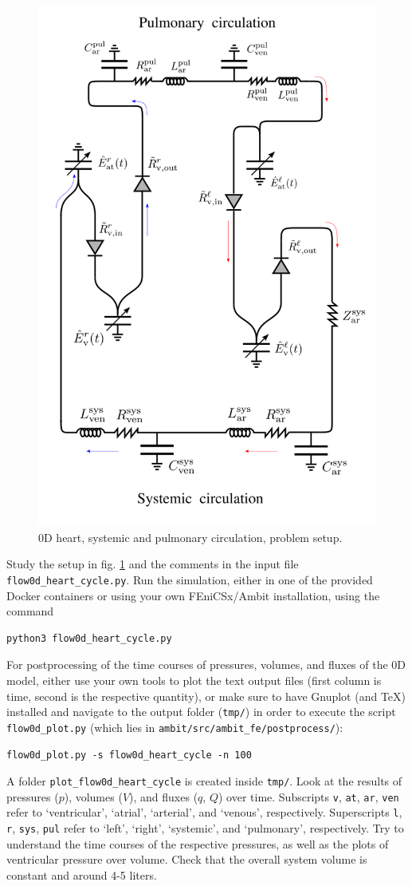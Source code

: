 \documentclass[a4paper,12pt]{report}
\begin{document}
\begin{figure}
\centering
\includegraphics[width=0.5\columnwidth]{fig/syspul_setup}
\caption{0D heart, systemic and pulmonary circulation, problem setup.}
\label{fig:syspul_setup}
\end{figure}

Study the setup in fig. \ref{fig:syspul_setup} and the comments in the input file \verb"flow0d_heart_cycle.py". Run the simulation, either in one of the provided Docker containers or using your own FEniCSx/Ambit installation, using the command
\begin{verbatim}
python3 flow0d_heart_cycle.py
\end{verbatim}

For postprocessing of the time courses of pressures, volumes, and fluxes of the 0D model, either use your own tools to plot the text output files (first column is time, second is the respective quantity), or make sure to have Gnuplot (and TeX) installed and navigate to the output folder (\verb"tmp/") in order to execute the script \verb"flow0d_plot.py" (which lies in \verb"ambit/src/ambit_fe/postprocess/"):
\begin{verbatim}
flow0d_plot.py -s flow0d_heart_cycle -n 100
\end{verbatim}
A folder \verb"plot_flow0d_heart_cycle" is created inside \verb"tmp/". Look at the results of pressures ($p$), volumes ($V$), and fluxes ($q$, $Q$) over time.
Subscripts \verb"v", \verb"at", \verb"ar", \verb"ven" refer to `ventricular', `atrial', `arterial', and `venous', respectively. Superscripts \verb"l", \verb"r", \verb"sys", \verb"pul" refer to `left', `right', `systemic', and
`pulmonary', respectively.
Try to understand the time courses of the respective pressures, as well as the plots of ventricular pressure over volume.
Check that the overall system volume is constant and around 4-5 liters.\\
\end{document}
